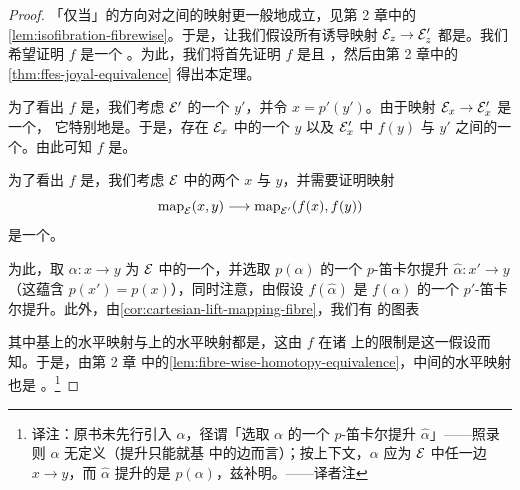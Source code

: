 \begin{proof}
「仅当」的方向对\trIsofibration{}之间的映射更一般地成立，见第 2 章中的%
\cref{lem:isofibration-fibrewise}。于是，让我们假设所有诱导映射
$\mathcal{E}_z \to \mathcal{E}'_z$ 都是\trJoyalEquivalence{}。我们希望证明 $f$ 是一个%
\trJoyalEquivalence{}。为此，我们将首先证明 $f$ 是\trFullyFaithful{}且%
\trEssentiallySurjective{}，然后由第 2 章中的\cref{thm:ffes-joyal-equivalence}
得出本定理。

为了看出 $f$ 是\trEssentiallySurjective{}，我们考虑 $\mathcal{E}'$ 的一个\trObject{}%
$y'$，并令 $x = p'(y')$。由于映射 $\mathcal{E}_x \to \mathcal{E}'_x$ 是一个\trJoyalEquivalence{}，
它特别地是\trEssentiallySurjective{}。于是，存在 $\mathcal{E}_x$ 中的一个\trObject{}%
$y$ 以及 $\mathcal{E}'_x$ 中 $f(y)$ 与 $y'$ 之间的一个\trEquivalence{}。由此可知 $f$
是\trEssentiallySurjective{}。

为了看出 $f$ 是\trFullyFaithful{}，我们考虑 $\mathcal{E}$ 中的两个\trObject{} $x$ 与
$y$，并需要证明映射
\[
\mathrm{map}_{\mathcal{E}}(x, y) \longrightarrow \mathrm{map}_{\mathcal{E}'}(f(x), f(y))
\]
是一个\trHomotopyEquivalence{}。

为此，取 $\alpha\colon x \to y$ 为 $\mathcal{E}$ 中的一个\trMorphism{}，并选取
$p(\alpha)$ 的一个 $p$-笛卡尔提升 $\hat{\alpha}\colon x' \to y$（这蕴含
$p(x') = p(x)$），同时注意，由假设 $f(\hat{\alpha})$ 是 $f(\alpha)$ 的一个
$p'$-笛卡尔提升。此外，由\cref{cor:cartesian-lift-mapping-fibre}，我们有%
\trHomotopy{}\trFibreSequence{}的图表
\begin{center}
\end{center}
其中基上的水平映射与\trFibre{}上的水平映射都是\trEquivalence{}，这由 $f$ 在诸%
\trFibre{}上的限制是\trFullyFaithful{}\trFunctor{}这一假设而知。于是，由第 2 章
中的\cref{lem:fibre-wise-homotopy-equivalence}，中间的水平映射也是%
\trEquivalence{}。\footnote{译注：原书未先行引入 $\alpha$，径谓「选取 $\alpha$
的一个 $p$-笛卡尔提升 $\hat{\alpha}$」——照录则 $\alpha$ 无定义（提升只能就基
中的边而言）；按上下文，$\alpha$ 应为 $\mathcal{E}$ 中任一边 $x \to y$，而 $\hat{\alpha}$
提升的是 $p(\alpha)$，兹补明。——译者注}
\end{proof}
